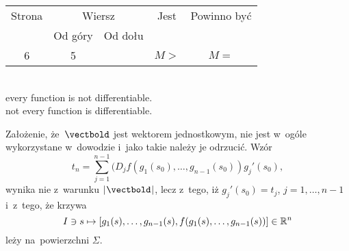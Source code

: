 \documentclass[a4paper,11pt]{article}
\begin{document}


\begin{center}

  \begin{tabular}{|c|c|c|c|c|}
    \hline
    Strona & \multicolumn{2}{c|}{Wiersz} & Jest
                              & Powinno być \\ \cline{2-3}
    & Od góry & Od dołu & & \\
    \hline
    6   &  5 & & $M >$ & $M =$ \\
    \hline
  \end{tabular}

\end{center}

\vspace{\spaceTwo}


\noindent
{} \\
\Jest  every function is not differentiable. \\
\Powin not every function is differentiable. \\















\newpage


\vspace{0em}




\noindent
{} Założenie, że~$\vectbold$ jest wektorem jednostkowym, nie
jest w~ogóle wykorzystane w~dowodzie i~jako takie należy je odrzucić. Wzór
\begin{equation}
  \label{eq:MarcinkowskaWDTRRCz-01}
  t_{ n } =
  \sum_{ j = 1 }^{ n - 1 } ( D_{ j } f\left( g_{ 1 }( s_{ 0 } ), \ldots,
  g_{ n - 1 }( s_{ 0 } ) \right) g_{ j }'( s_{ 0 } ),
\end{equation}
wynika nie z~warunku $\absOne{ \vectbold }$, lecz z~tego,
iż $g_{ j }'( s_{ 0 } ) = t_{ j }$, $j = 1, \ldots, n - 1$ i~z~tego, że krzywa
\begin{equation}
  \label{eq:MarcinkowskaWDTRRCz-02}
  I \ni s \mapsto [ g_{ 1 }( s ), \ldots, g_{ n - 1 }( s ),
  f( g_{ 1 }( s ), \ldots, g_{ n - 1 }( s ) ) ] \in \mathbb{R}^{ n }
\end{equation}
leży na~powierzchni $\Sigma$.
\end{document}
